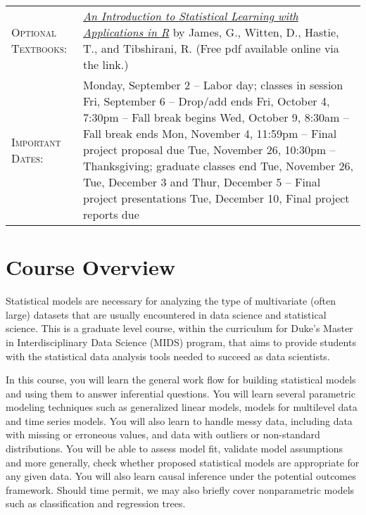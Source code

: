 \documentclass[11pt, a4paper]{article}
\begin{document}
\begin{center}
\begin{minipage}[t]{.9\textwidth}
\begin{tabular}{@{}L{3cm}L{12cm}}
\textsc{Optional Textbooks:}	& \href{http://faculty.marshall.usc.edu/gareth-james/ISL/}{\textit{An Introduction to Statistical Learning with Applications in R}} by James, G., Witten, D., Hastie, T., and Tibshirani, R. (Free pdf available online via the link.) \\
\textsc{Important Dates:} & Monday, September 2 -- Labor day; classes in session \newline Fri, September 6 -- Drop/add ends \newline Fri, October 4, 7:30pm -- Fall break begins \newline Wed, October 9, 8:30am -- Fall break ends \newline Mon, November 4, 11:59pm -- Final project proposal due \newline Tue, November 26, 10:30pm -- Thanksgiving; graduate classes end \newline Tue, November 26, Tue, December 3 and Thur, December 5 -- Final project presentations \newline Tue, December 10, Final project reports due \\
	 \bottomrule[0.065cm]
\end{tabular}
\end{minipage}
\end{center}


\vspace{.5cm}
\setlength{\unitlength}{1in}
\renewcommand{\arraystretch}{1.5}



\section{Course Overview}
Statistical models are necessary for analyzing the type of multivariate (often large) datasets that are usually encountered in data science and statistical science. This is a graduate level course, within the curriculum for Duke's Master in Interdisciplinary Data Science (MIDS) program, that aims to provide students with the statistical data analysis tools needed to succeed as data scientists. 

In this course, you will learn the general work flow for building statistical models and using them to answer inferential questions. You will learn several parametric modeling techniques such as generalized linear models, models for multilevel data and time series models. You will also learn to handle messy data, including data with missing or erroneous values, and data with outliers or non-standard distributions. You will be able to assess model fit, validate model assumptions and more generally, check whether proposed statistical models are appropriate for any given data. You will also learn causal inference under the potential outcomes framework. Should time permit, we may also briefly cover nonparametric models such as classification and regression trees. 
\end{document}
